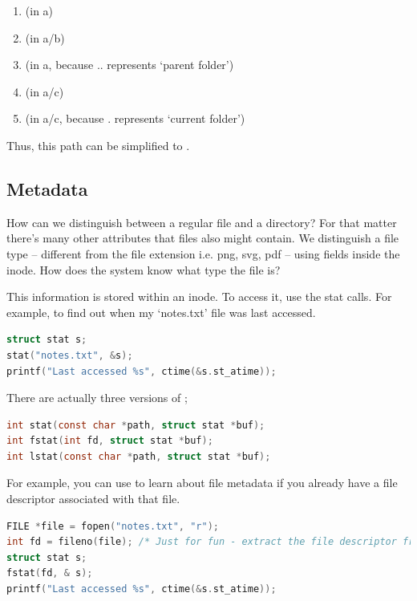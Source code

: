 \begin{enumerate}
  \item {} (in a)
  \item {} (in a/b)
  \item {} (in a, because .. represents `parent folder')
  \item {} (in a/c)
  \item {} (in a/c, because . represents `current folder')
\end{enumerate}

Thus, this path can be simplified to .

\subsection{Metadata}

How can we distinguish between a regular file and a directory?
For that matter there's many other attributes that files also might contain.
We distinguish a file type -- different from the file extension i.e. png, svg, pdf -- using fields inside the inode.
How does the system know what type the file is?

This information is stored within an inode.
To access it, use the stat calls.
For example, to find out when my `notes.txt' file was last accessed.

\begin{lstlisting}[language=C]
struct stat s;
stat("notes.txt", &s);
printf("Last accessed %s", ctime(&s.st_atime));
\end{lstlisting}

There are actually three versions of ;

\begin{lstlisting}[language=C]
int stat(const char *path, struct stat *buf);
int fstat(int fd, struct stat *buf);
int lstat(const char *path, struct stat *buf);
\end{lstlisting}

For example, you can use  to learn about file metadata if you already have a file descriptor associated with that file.

\begin{lstlisting}[language=C]
FILE *file = fopen("notes.txt", "r");
int fd = fileno(file); /* Just for fun - extract the file descriptor from a C FILE struct */
struct stat s;
fstat(fd, & s);
printf("Last accessed %s", ctime(&s.st_atime));
\end{lstlisting}

